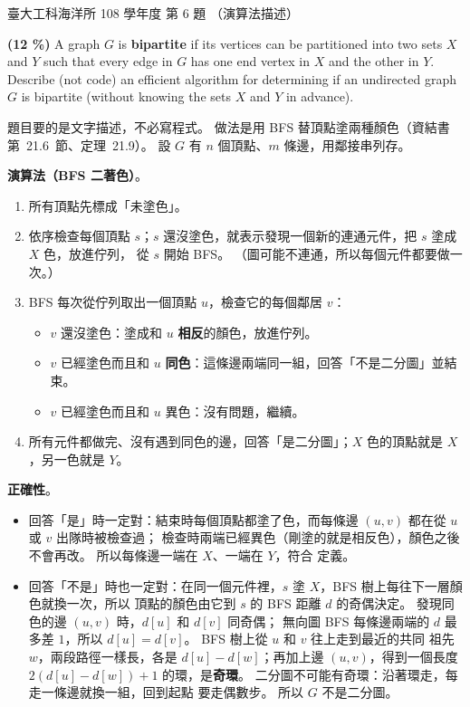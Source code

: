 \begin{pastexam}[label={px:ntu-108-esoe-ds-06}]{臺大工科海洋所 108 學年度 第 6 題}
（演算法描述）

\textbf{(12 \%)} A graph $G$ is \textbf{bipartite} if its vertices can be partitioned into two sets $X$
and $Y$ such that every edge in $G$ has one end vertex in $X$ and the other in $Y$. Describe (not
code) an efficient algorithm for determining if an undirected graph $G$ is bipartite (without knowing
the sets $X$ and $Y$ in advance).
\end{pastexam}

\begin{pastsoln}
題目要的是文字描述，不必寫程式。 做法是用 BFS 替頂點塗兩種顏色（資結書第~21.6~節、定理~21.9）。
設 $G$ 有 $n$ 個頂點、$m$ 條邊，用鄰接串列存。

\textbf{演算法（BFS 二著色）}。
\begin{enumerate}
\item 所有頂點先標成「未塗色」。
\item 依序檢查每個頂點 $s$；$s$ 還沒塗色，就表示發現一個新的連通元件，把 $s$ 塗成 $X$ 色，放進佇列，
從 $s$ 開始 BFS。 （圖可能不連通，所以每個元件都要做一次。）
\item BFS 每次從佇列取出一個頂點 $u$，檢查它的每個鄰居 $v$：
\begin{itemize}
\item $v$ 還沒塗色：塗成和 $u$ \textbf{相反}的顏色，放進佇列。
\item $v$ 已經塗色而且和 $u$ \textbf{同色}：這條邊兩端同一組，回答「不是二分圖」並結束。
\item $v$ 已經塗色而且和 $u$ 異色：沒有問題，繼續。
\end{itemize}
\item 所有元件都做完、沒有遇到同色的邊，回答「是二分圖」；$X$ 色的頂點就是 $X$，另一色就是 $Y$。
\end{enumerate}

\textbf{正確性}。
\begin{itemize}
\item 回答「是」時一定對：結束時每個頂點都塗了色，而每條邊 $(u, v)$ 都在從 $u$ 或 $v$ 出隊時被檢查過；
檢查時兩端已經異色（剛塗的就是相反色），顏色之後不會再改。 所以每條邊一端在 $X$、一端在 $Y$，符合
定義。
\item 回答「不是」時也一定對：在同一個元件裡，$s$ 塗 $X$，BFS 樹上每往下一層顏色就換一次，所以
頂點的顏色由它到 $s$ 的 BFS 距離 $d$ 的奇偶決定。 發現同色的邊 $(u, v)$ 時，$d[u]$ 和 $d[v]$ 同奇偶；
無向圖 BFS 每條邊兩端的 $d$ 最多差 $1$，所以 $d[u] = d[v]$。 BFS 樹上從 $u$ 和 $v$ 往上走到最近的共同
祖先 $w$，兩段路徑一樣長，各是 $d[u] - d[w]$；再加上邊 $(u, v)$，得到一個長度
$2(d[u] - d[w]) + 1$ 的環，是\textbf{奇環}。 二分圖不可能有奇環：沿著環走，每走一條邊就換一組，回到起點
要走偶數步。 所以 $G$ 不是二分圖。
\end{itemize}


\end{pastsoln}
